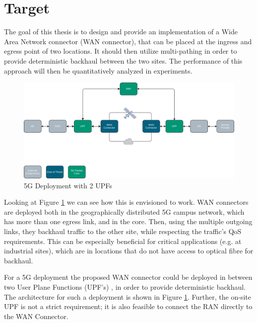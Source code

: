
\section{Target}
\label{sec:target}

The goal of this thesis is to design and provide an implementation of a Wide Area Network connector (WAN connector), that can be placed at the ingress and egress point of two locations. It should then utilize multi-pathing in order to provide deterministic backhaul between the two sites. The performance of this approach will then be quantitatively analyzed in experiments.

\begin{figure}[h]
    \centering
        \includegraphics[width=\textwidth]{fig/telco-use-case-2.png}
        \caption{5G Deployment with 2 UPFs}
        \label{fig:telco}
\end{figure}

Looking at Figure \ref{fig:telco} we can see how this is envisioned to work. WAN connectors are deployed both in the geographically distributed 5G campus network, which has more than one egress link, and in the core. Then, using the multiple outgoing links, they backhaul traffic to the other site, while respecting the traffic's QoS requirements. This can be especially beneficial for critical applications (e.g. at industrial sites), which are in locations that do not have access to optical fibre for backhaul.

For a 5G deployment the proposed WAN connector could be deployed in between two User Plane Functions (UPF's) , in order to provide deterministic backhaul. The architecture for such a deployment is shown in Figure \ref{fig:telco}. Further, the on-site UPF is not a strict requirement; it is also feasible to connect the RAN directly to the WAN Connector.


